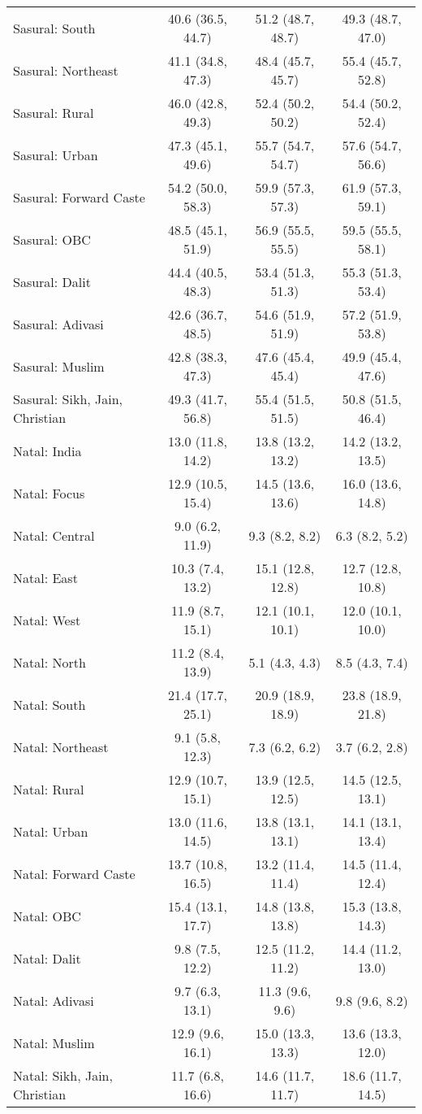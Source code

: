 \begin{tabular}{lccc}
Sasural: South&40.6 (36.5, 44.7)&51.2 (48.7, 48.7)&49.3 (48.7, 47.0)\\
Sasural: Northeast&41.1 (34.8, 47.3)&48.4 (45.7, 45.7)&55.4 (45.7, 52.8)\\
Sasural: Rural&46.0 (42.8, 49.3)&52.4 (50.2, 50.2)&54.4 (50.2, 52.4)\\
Sasural: Urban&47.3 (45.1, 49.6)&55.7 (54.7, 54.7)&57.6 (54.7, 56.6)\\
Sasural: Forward Caste&54.2 (50.0, 58.3)&59.9 (57.3, 57.3)&61.9 (57.3, 59.1)\\
Sasural: OBC&48.5 (45.1, 51.9)&56.9 (55.5, 55.5)&59.5 (55.5, 58.1)\\
Sasural: Dalit&44.4 (40.5, 48.3)&53.4 (51.3, 51.3)&55.3 (51.3, 53.4)\\
Sasural: Adivasi&42.6 (36.7, 48.5)&54.6 (51.9, 51.9)&57.2 (51.9, 53.8)\\
Sasural: Muslim&42.8 (38.3, 47.3)&47.6 (45.4, 45.4)&49.9 (45.4, 47.6)\\
Sasural: Sikh, Jain, Christian&49.3 (41.7, 56.8)&55.4 (51.5, 51.5)&50.8 (51.5, 46.4)\\
Natal: India&13.0 (11.8, 14.2)&13.8 (13.2, 13.2)&14.2 (13.2, 13.5)\\
Natal: Focus&12.9 (10.5, 15.4)&14.5 (13.6, 13.6)&16.0 (13.6, 14.8)\\
Natal: Central&9.0 (6.2, 11.9)&9.3 (8.2, 8.2)&6.3 (8.2, 5.2)\\
Natal: East&10.3 (7.4, 13.2)&15.1 (12.8, 12.8)&12.7 (12.8, 10.8)\\
Natal: West&11.9 (8.7, 15.1)&12.1 (10.1, 10.1)&12.0 (10.1, 10.0)\\
Natal: North&11.2 (8.4, 13.9)&5.1 (4.3, 4.3)&8.5 (4.3, 7.4)\\
Natal: South&21.4 (17.7, 25.1)&20.9 (18.9, 18.9)&23.8 (18.9, 21.8)\\
Natal: Northeast&9.1 (5.8, 12.3)&7.3 (6.2, 6.2)&3.7 (6.2, 2.8)\\
Natal: Rural&12.9 (10.7, 15.1)&13.9 (12.5, 12.5)&14.5 (12.5, 13.1)\\
Natal: Urban&13.0 (11.6, 14.5)&13.8 (13.1, 13.1)&14.1 (13.1, 13.4)\\
Natal: Forward Caste&13.7 (10.8, 16.5)&13.2 (11.4, 11.4)&14.5 (11.4, 12.4)\\
Natal: OBC&15.4 (13.1, 17.7)&14.8 (13.8, 13.8)&15.3 (13.8, 14.3)\\
Natal: Dalit&9.8 (7.5, 12.2)&12.5 (11.2, 11.2)&14.4 (11.2, 13.0)\\
Natal: Adivasi&9.7 (6.3, 13.1)&11.3 (9.6, 9.6)&9.8 (9.6, 8.2)\\
Natal: Muslim&12.9 (9.6, 16.1)&15.0 (13.3, 13.3)&13.6 (13.3, 12.0)\\
Natal: Sikh, Jain, Christian&11.7 (6.8, 16.6)&14.6 (11.7, 11.7)&18.6 (11.7, 14.5)\\
\bottomrule
\end{tabular}
